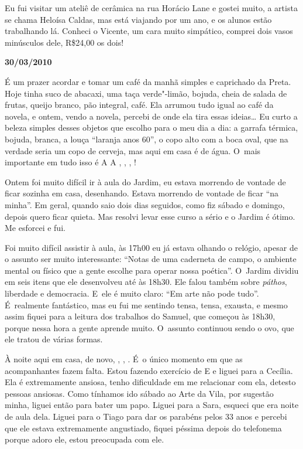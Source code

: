 Eu fui visitar um ateliê de cerâmica na rua Horácio Lane e gostei muito,
a artista se chama Heloísa Caldas, mas está viajando por um ano, e os
alunos estão trabalhando lá. Conheci o Vicente, um cara muito simpático,
comprei dois vasos minúsculos dele, R\$24,00 os dois!

\begin{flushright}\textbf{30/03/2010}\end{flushright}


É um prazer acordar e tomar um café da manhã simples e caprichado da
Preta. Hoje tinha suco de abacaxi, uma taça verde"-limão, bojuda, cheia
de salada de frutas, queijo branco, pão integral, café. Ela arrumou tudo
igual ao café da novela, e ontem, vendo a novela, percebi de onde ela
tira essas ideias… Eu curto a beleza simples desses objetos que
escolho para o meu dia a dia: a garrafa térmica, bojuda, branca, a louça
``laranja anos 60'', o copo alto com a boca oval, que na verdade seria
um copo de cerveja, mas aqui em casa é de água. O~mais importante em
tudo isso é   A      
   A , , , !

Ontem foi muito difícil ir à aula do Jardim, eu estava morrendo de
vontade de ficar sozinha em casa, desenhando. Estava morrendo de vontade
de ficar ``na minha''. Em geral, quando saio dois dias seguidos, como
fiz sábado e domingo, depois quero ficar quieta. Mas resolvi levar esse
curso a sério e o Jardim é ótimo. Me esforcei e fui.

Foi muito difícil assistir à aula, às 17h00 eu já estava olhando o
relógio, apesar de o assunto ser muito interessante: ``Notas de uma
caderneta de campo, o ambiente mental ou físico que a gente escolhe para
operar nossa poética''. O~Jardim dividiu em seis itens que ele
desenvolveu até às 18h30. Ele falou também sobre \emph{páthos},
liberdade e democracia. E~ele é muito claro: ``Em arte não pode tudo''.
É~realmente fantástico, mas eu fui me sentindo tensa, tensa, exausta,
e mesmo assim fiquei para a leitura dos trabalhos do Samuel, que começou
às 18h30, porque nessa hora a gente aprende muito. O~assunto continuou
sendo o ovo, que ele tratou de várias formas.

À noite aqui em casa, de novo, , , . É~o único
momento em que as acompanhantes fazem falta. Estou fazendo exercício de
 E  e liguei para a Cecília. Ela é extremamente
ansiosa, tenho dificuldade em me relacionar com ela, detesto pessoas
ansiosas. Como tínhamos ido sábado ao Arte da Vila, por sugestão minha,
liguei então para bater um papo. Liguei para a Sara, esqueci que era
noite de aula dela. Liguei para o Tiago para dar os parabéns pelos 33
anos e percebi que ele estava extremamente angustiado, fiquei péssima
depois do telefonema porque adoro ele, estou preocupada com ele.

